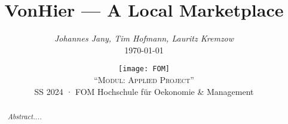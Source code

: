 \documentclass[12pt,a4paper,fancyheader]{scrartcl}
\newcommand\svthema{VonHier --- A Local Marketplace}
\newcommand\svperson{Johannes Jany, Tim Hofmann, Lauritz Kremzow}
\newcommand\svdatum{\today}
\newcommand\lvname{Modul: Applied Project}
\newcommand\lvtyp{SS 2024}
\newcommand\lvinst{FOM Hochschule für Oekonomie \& Management}
\newcommand{\blindtext}{\textit{
  Abstract....
}}
\begin{document}
\title{ \huge\textbf{\svthema} }
\author{ \textsl{\svperson} \\ \svdatum }
\date{ \normalsize \centering \texttt{[image: FOM]}\\\textsc{"`\lvname"'} \\ {\lvtyp} · {\lvinst} }

\maketitle
\thispagestyle{empty}

\begin{abstract}
\blindtext
\end{abstract}

\cleardoublepage
\tableofcontents

\cleardoublepage
\listoffigures

\cleardoublepage
{}
\setcounter{page}{4}



\cleardoublepage


\end{document}
